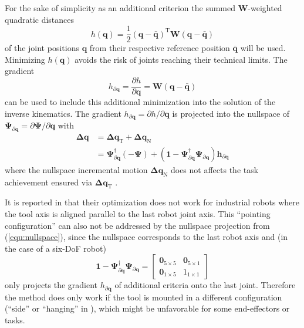 \documentclass[twocolumn,10pt]{IFTOMM}
\newcommand{\bm}[1]{\boldsymbol{#1}}
\newcommand{\transp}[0]{{\mathrm{T}}}
\begin{document}
For the sake of simplicity as an additional criterion the summed $\bm{W}$-weighted quadratic distances
%
\begin{equation}
h(\bm{q})
=
\frac{1}{2} (\bm{q}-\bar{\bm{q}})^\transp\bm{W}(\bm{q}-\bar{\bm{q}})
\end{equation}  
%
of the joint positions $\bm{q}$ from their respective reference position $\bar{\bm{q}}$ will be used.
Minimizing $h(\bm{q})$ avoids the risk of joints reaching their technical limits.
The gradient
%
\begin{equation}
h_{\partial\bm{q}}
=
\frac{\partial h}{\partial \bm{q}}
=
\bm{W}(\bm{q}-\bar{\bm{q}})
\end{equation}
%
can be used to include this additional minimization into the solution of the inverse kinematics.
The gradient $h_{\partial\bm{q}}=\partial h/\partial \bm{q}$ is projected into the nullspace of $\bm{\Psi}_{\partial\bm{q}}=\partial \bm{\Psi}/\partial \bm{q}$ with
%
\begin{align}
\bm{\Delta}\bm{q}
&=
\bm{\Delta}\bm{q}_{\mathrm{T}} + \bm{\Delta}\bm{q}_{\mathrm{N}} \nonumber \\
&=
\bm{\Psi}_{\partial\bm{q}}^{\dagger} (-\bm{\Psi}) +  (\bm{1}-\bm{\Psi}_{\partial\bm{q}}^{\dagger}\bm{\Psi}_{\partial\bm{q}}) \bm{h}_{\partial\bm{q}}
\label{equ:nullspace}
\end{align}
%
where the nullspace incremental motion $\bm{\Delta}\bm{q}_{\mathrm{N}}$ does not affects the task achievement ensured via $\bm{\Delta}\bm{q}_{\mathrm{T}}$ \cite{Yoshikawa1984}.

It is reported in \cite{GuoDonKe2015} that their optimization does not work for industrial robots where the tool axis is aligned parallel to the last robot joint axis.
This ``pointing configuration'' can also not be addressed by the nullspace projection from (\ref{equ:nullspace}), since the nullspace corresponds to the last robot axis and (in the case of a six-DoF robot)
%
\begin{equation}
\bm{1}-\bm{\Psi}_{\partial\bm{q}}^{\dagger}\bm{\Psi}_{\partial\bm{q}}
=
\begin{bmatrix}
\bm{0}_{5 \times 5} & \bm{0}_{5 \times 1} \\
\bm{0}_{1 \times 5} & 1_{1 \times 1}
\end{bmatrix}
\end{equation}
%
only projects the gradient $h_{\partial\bm{q}}$ of additional criteria onto the last joint.
Therefore the method does only work if the tool is mounted in a different configuration (``side'' or ``hanging'' in \cite{GuoDonKe2015}), which might be unfavorable for some end-effectors or tasks.
\end{document}
